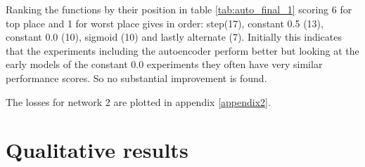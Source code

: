          Ranking the functions by their position in table \ref{tab:auto_final_1} scoring 6 for top place and 1 for worst place gives in order:
          step(17), constant 0.5 (13), constant 0.0 (10), sigmoid (10) and lastly alternate (7). Initially this indicates that the
          experiments including the autoencoder perform better but looking at the early models of the constant 0.0 experiments
          they often have very similar performance scores. So no substantial improvement is found.

          The losses for network 2 are plotted in appendix \ref{appendix2}.

    \section{Qualitative results}

